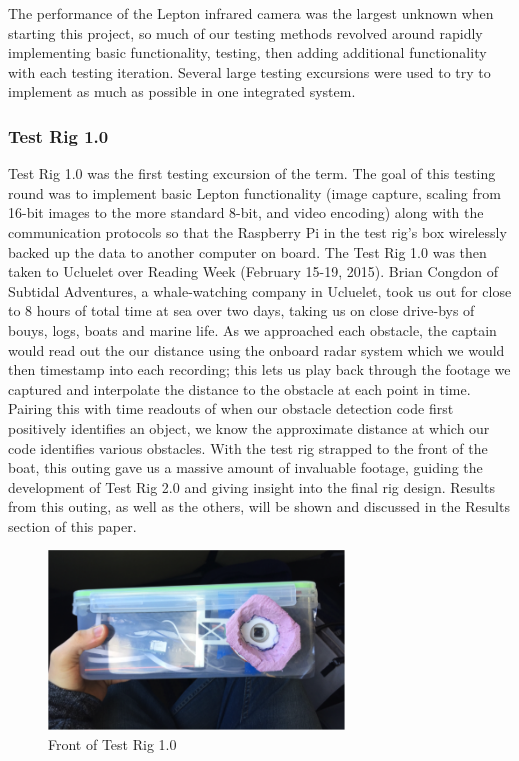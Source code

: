 The performance of the Lepton infrared camera was the largest unknown when starting this project, so much of our testing methods revolved around rapidly implementing basic functionality, testing, then adding additional functionality with each testing iteration. Several large testing excursions were used to try to implement as much as possible in one integrated system.


\subsubsection{\label{sec:discussion:testing:testrig1}Test Rig 1.0}

Test Rig 1.0 was the first testing excursion of the term. The goal of this testing round was to implement basic Lepton functionality (image capture, scaling from 16-bit images to the more standard 8-bit, and video encoding) along with the communication protocols so that the Raspberry Pi in the test rig's box wirelessly backed up the data to another computer on board. The Test Rig 1.0 was then taken to Ucluelet over Reading Week (February 15-19, 2015). Brian Congdon of Subtidal Adventures, a whale-watching company in Ucluelet, took us out for close to 8 hours of total time at sea over two days, taking us on close drive-bys of bouys, logs, boats and marine life. As we approached each obstacle, the captain would read out the our distance using the onboard radar system which we would then timestamp into each recording; this lets us play back through the footage we captured and interpolate the distance to the obstacle at each point in time. Pairing this with time readouts of when our obstacle detection code first positively identifies an object, we know the approximate distance at which our code identifies various obstacles. With the test rig strapped to the front of the boat, this outing gave us a massive amount of invaluable footage, guiding the development of Test Rig 2.0 and giving insight into the final rig design. Results from this outing, as well as the others, will be shown and discussed in the Results section of this paper.

\begin{figure}[h]
\centering
\includegraphics[width=0.7\textwidth]{"./image/testrig1_front"}
\caption{Front of Test Rig 1.0}
\label{fig:testrig1_testing}
\end{figure}


